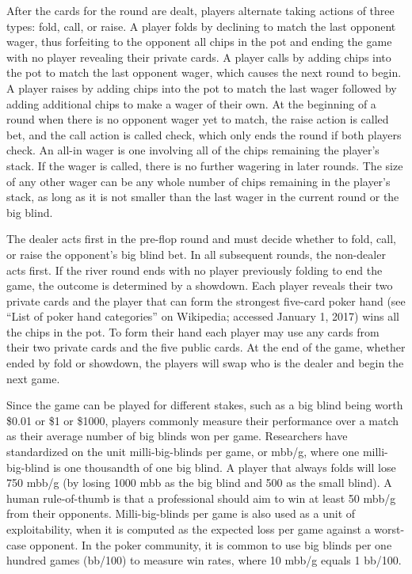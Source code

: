 After the cards for the round are dealt, players alternate taking actions of
three types: fold, call, or raise. A player folds by declining to match the last opponent wager,
thus forfeiting to the opponent all chips in the pot and ending the game with no player revealing
their private cards. A player calls by adding chips into the pot to match the last opponent wager,
which causes the next round to begin. A player raises by adding chips into the pot to match the
last wager followed by adding additional chips to make a wager of their own. At the beginning
of a round when there is no opponent wager yet to match, the raise action is called bet, and
the call action is called check, which only ends the round if both players check. 
An all-in wager is one
involving all of the chips remaining the player's stack.  If the wager is called, there is no further 
wagering in later rounds.
The size of
any other wager can be any whole number of chips remaining in the player's stack, as long as it
is not smaller than the last wager in the current round or the big blind.  

The dealer acts first in the pre-flop round and must decide whether to fold, call, or raise the opponent's big blind bet.  In all subsequent rounds, the non-dealer acts first.
If the river round ends with no player previously folding to end the game, the outcome is
determined by a showdown. Each player reveals their two private cards and the player that can
form the strongest five-card poker hand (see ``List of poker hand categories'' on Wikipedia; accessed January
1, 2017) wins all the chips in the pot. To form their hand each player may use any cards from
their two private cards and the five public cards. At the end of the game, whether ended by
fold or showdown, the players will swap who is the dealer and begin the next game.

Since the game can be played for different stakes, such as a big blind being worth \$0.01
or \$1 or \$1000, players commonly measure their performance over a match as their average
number of big blinds won per game. Researchers have standardized on the unit milli-big-blinds
per game, or mbb/g, where one milli-big-blind is one thousandth of one big blind. A player that always
folds will lose 750 mbb/g (by losing 1000 mbb as the big blind and 500 as the small blind).
A human rule-of-thumb is that a professional should aim to win at least 50 mbb/g from their
opponents. Milli-big-blinds per game is also used as a unit of exploitability, when it is computed
as the expected loss per game against a worst-case opponent.  In the poker community, it is common to use big blinds per one hundred games (bb/100) to measure win rates, where 10 mbb/g equals 1 bb/100.

